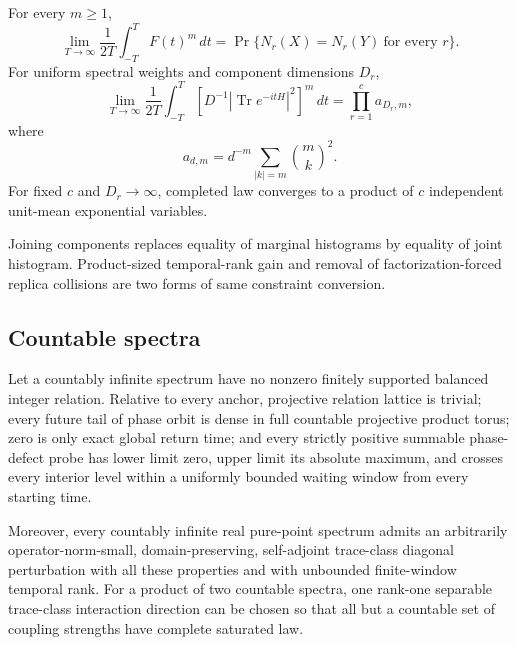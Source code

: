 \begin{theorem}
\label{thm:componentcollision}
For every $m\ge1$,
\begin{equation}
 \lim_{T\to\infty}\frac1{2T}\int_{-T}^{T}F(t)^m\,dt
 =\Pr\{N_r(X)=N_r(Y)\ \text{for every }r\}.           \label{eq:histcollision}
\end{equation}
For uniform spectral weights and component dimensions $D_r$,
\begin{equation}
 \lim_{T\to\infty}\frac1{2T}\int_{-T}^{T}
 \left[D^{-1}|\operatorname{Tr}e^{-itH}|^2\right]^m\,dt
 =\prod_{r=1}^c a_{D_r,m},                            \label{eq:sffproduct}
\end{equation}
where
\begin{equation}
 a_{d,m}=d^{-m}\sum_{|k|=m}\binom{m}{k}^{\!2}.        \label{eq:adm}
\end{equation}
For fixed $c$ and $D_r\to\infty$, completed law converges to a product of
$c$ independent unit-mean exponential variables.
\end{theorem}

Joining components replaces equality of marginal histograms by equality of
joint histogram.  Product-sized temporal-rank gain and removal of
factorization-forced replica collisions are two forms of same constraint
conversion.

\subsection{Countable spectra}

\begin{theorem}
\label{thm:countable}
Let a countably infinite spectrum have no nonzero finitely supported balanced
integer relation.  Relative to every anchor, projective relation lattice is
trivial; every future tail of phase orbit is dense in full countable
projective product torus; zero is only exact global return time; and every
strictly positive summable phase-defect probe has lower limit zero, upper
limit its absolute maximum, and crosses every interior level within a
uniformly bounded waiting window from every starting time.

Moreover, every countably infinite real pure-point spectrum admits an
arbitrarily operator-norm-small, domain-preserving, self-adjoint trace-class
diagonal perturbation with all these properties and with unbounded
finite-window temporal rank.  For a product of two countable spectra, one
rank-one separable trace-class interaction direction can be chosen so that
all but a countable set of coupling strengths have complete saturated law.
\end{theorem}

